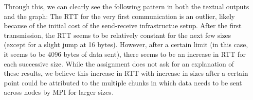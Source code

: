 \documentclass[a4paper,10pt]{article}
\begin{document}
Through this, we can clearly see the following pattern in both the textual outputs and the graph: The RTT for the very first communication is an outlier, likely because of the initial cost of the send-receive infrastructue setup. After the first transmission, the RTT seems to be relatively constant for the next few sizes (except for a slight jump at 16 bytes). However, after a certain limit (in this case, it seems to be 4096 bytes of data sent), there seems to be an increase in RTT for each successive size. While the assignment does not ask for an explanation of these results, we believe this increase in RTT with increase in sizes after a certain point could be attributed to the multiple chunks in which data needs to be sent across nodes by MPI for larger sizes. 




\end{document}
